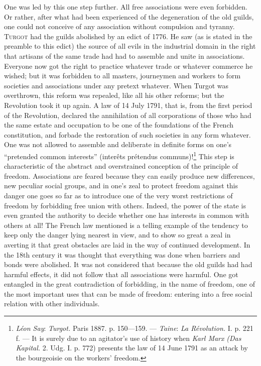 \documentclass[12pt,a4paper,openany]{book}
\newcommand{\opage}[1]{\marginnote{\footnotesize\textit{[#1]}}}
\begin{document}
One was led by this one step further. All free associations were even forbidden. Or rather, after what had been
experienced of the degeneration of the old guilds, one could not conceive of any association without compulsion and
tyranny. \textsc{Turgot} had the guilds abolished by an edict of 1776. He saw (as is stated in the preamble to this edict)
the source of all evils in the industrial domain in the right that artisans of the same trade had had to assemble and
unite in associations. Everyone now got the right to practice whatever trade or whatever commerce he wished; but it was
forbidden to all masters, journeymen
\opage{354}and workers to form societies and associations under any pretext whatever. When Turgot was overthrown, this
reform was repealed, like all his other reforms; but the Revolution took it up again. A law of 14 July 1791, %
that is,
from the first period of the Revolution, declared the annihilation of all corporations of those who had the same estate
and occupation to be one of the foundations of the French constitution, and forbade the restoration of such societies in
any form whatever. One was not allowed to assemble and deliberate in definite forms on one's ``pretended common
interests'' (interêts prétendus communs)!\footnote[1]{\emph{Léon Say}: \textit{Turgot.} Paris 1887. p. 150---159. ---
\emph{Taine}: \textit{La Révolution.} I. p. 221 f. --- It is surely due to an agitator's use of history when \emph{Karl Marx}
\textit{(Das Kapital.} 2. Udg. I. p. 772) presents the law of 14 June 1791 as an attack by the bourgeoisie on the
workers' freedom.} This step is characteristic of the abstract and overstrained conception of the principle of freedom.
Associations are feared because they can easily produce new differences, new peculiar social groups, and in one's zeal to
protect freedom against this danger one goes so far as to introduce one of the very worst restrictions of freedom by
forbidding free union with others. Indeed, the power of the state is even granted the authority to decide whether one has
interests in common with others at all! The French law mentioned is a telling example of the tendency to keep only the
danger lying nearest in view, and to show so great a zeal in averting it that great obstacles are laid in the way of
continued development. In the 18th century it was thought that everything was done when barriers and bonds were
abolished. It was not considered that because the old guilds had had harmful effects, it did not follow that all
associations were harmful. One got entangled in the great contradiction of forbidding, in the name of freedom, one of the
most important uses that can be made of freedom: entering into a free social relation with other individuals.
\end{document}
